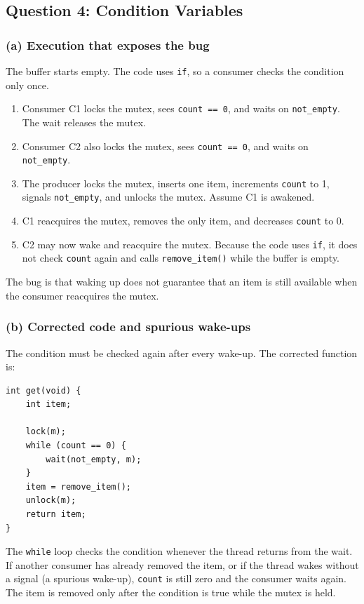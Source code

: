 \documentclass[conference]{IEEEtran}
\begin{document}
\subsection{Question 4: Condition Variables}

\subsubsection{(a) Execution that exposes the bug}
The buffer starts empty. The code uses \texttt{if}, so a consumer checks the condition only once.

\begin{enumerate}
    \item Consumer C1 locks the mutex, sees \texttt{count == 0}, and waits on \texttt{not\_empty}. The wait releases the mutex.
    \item Consumer C2 also locks the mutex, sees \texttt{count == 0}, and waits on \texttt{not\_empty}.
    \item The producer locks the mutex, inserts one item, increments \texttt{count} to 1, signals \texttt{not\_empty}, and unlocks the mutex. Assume C1 is awakened.
    \item C1 reacquires the mutex, removes the only item, and decreases \texttt{count} to 0.
    \item C2 may now wake and reacquire the mutex. Because the code uses \texttt{if}, it does not check \texttt{count} again and calls \texttt{remove\_item()} while the buffer is empty.
\end{enumerate}

The bug is that waking up does not guarantee that an item is still available when the consumer reacquires the mutex.

\subsubsection{(b) Corrected code and spurious wake-ups}
The condition must be checked again after every wake-up. The corrected function is:

\begin{lstlisting}[style=cstyle]
int get(void) {
    int item;

    lock(m);
    while (count == 0) {
        wait(not_empty, m);
    }
    item = remove_item();
    unlock(m);
    return item;
}
\end{lstlisting}

The \texttt{while} loop checks the condition whenever the thread returns from the wait. If another consumer has already removed the item, or if the thread wakes without a signal (a spurious wake-up), \texttt{count} is still zero and the consumer waits again. The item is removed only after the condition is true while the mutex is held.
\end{document}
